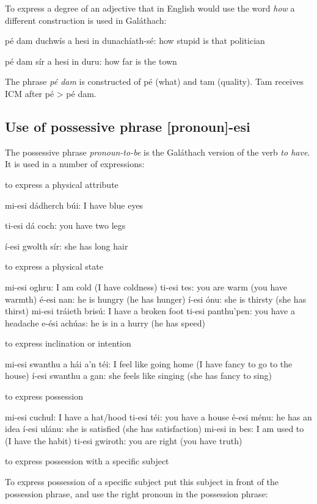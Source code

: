 To express a degree of an adjective that in English would use the word \textit{how} a different construction is used in Gal\'{a}thach:

p\'{e} dam duchw\'{i}s a hesi in dunach\'{i}ath-s\'{e}: how stupid is that politician

p\'{e} dam s\'{i}r a hesi in duru: how far is the town

The phrase \textit{p\'{e} dam} is constructed of p\'{e} (what) and tam (quality). Tam receives ICM after p\'{e} > p\'{e} dam.

\subsection{Use of possessive phrase [pronoun]-esi}

The possessive phrase \textit{pronoun-to-be} is the Gal\'{a}thach version of the verb \textit{to have}. It is used in a number of expressions:

    to express a physical attribute

mi-esi d\'{a}dherch b\'{u}i: I have blue eyes

ti-esi d\'{a} coch: you have two legs

\'{i}-esi gwolth s\'{i}r: she has long hair

    to express a physical state

mi-esi oghru: I am cold (I have coldness)
ti-esi tes: you are warm (you have warmth)
\'{e}-esi nan: he is hungry (he has hunger)
\'{i}-esi \'{o}nu: she is thirsty (she has thirst)
mi-esi tr\'{a}ieth bris\'{u}: I have a broken foot
ti-esi panthu'pen: you have a headache
e-\'{e}si ach\'{u}as: he is in a hurry (he has speed)

    to express inclination or intention

mi-esi swanthu a h\'{a}i a'n t\'{e}i: I feel like going home (I have fancy to go to the house)
\'{i}-esi swanthu a gan: she feels like singing (she has fancy to sing)

    to express possession

mi-esi cuchul: I have a hat/hood
ti-esi t\'{e}i: you have a house
\'{e}-esi m\'{e}nu: he has an idea
\'{i}-esi ul\'{a}nu: she is satisfied (she has satisfaction)
mi-esi in bes: I am used to (I have the habit)
ti-esi gwiroth: you are right (you have truth)

    to express possession with a specific subject

To express possession of a specific subject put this subject in front of the possession phrase, and use the right pronoun in the possession phrase:

